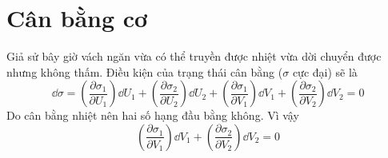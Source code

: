 \section{Cân bằng cơ}
	Giả sử bây giờ vách ngăn vừa có thể truyền được nhiệt vừa dời chuyển được nhưng không thấm. Điều kiện của trạng thái cân bằng ($ \sigma $ cực đại) sẽ là
	\begin{equation*}
		\dd{\sigma} = \left(\dfrac{\partial \sigma_1}{\partial U_1}\right) \dd{U_1} + \left(\dfrac{\partial \sigma_2}{\partial U_2}\right) \dd{U_2} + \left(\dfrac{\partial \sigma_1}{\partial V_1}\right) \dd{V_1} + \left(\dfrac{\partial \sigma_2}{\partial V_2}\right) \dd{V_2} = 0
	\end{equation*}
	Do cân bằng nhiệt nên hai số hạng đầu bằng không. Vì vậy
	\begin{equation*}
		\left(\dfrac{\partial \sigma_1}{\partial V_1}\right) \dd{V_1} + \left(\dfrac{\partial \sigma_2}{\partial V_2}\right) \dd{V_2} = 0
	\end{equation*}